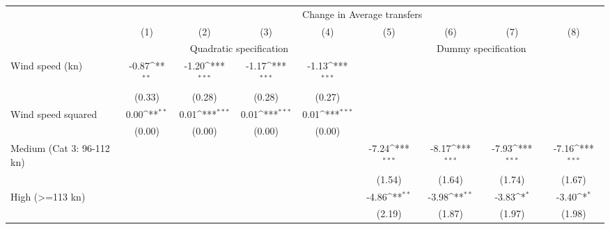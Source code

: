 {
\def\sym#1{\ifmmode^{#1}\else\(^{#1}\)\fi}
\begin{tabular}{l*{8}{c}}
\toprule
                    &\multicolumn{8}{c}{Change in Average transfers}                                                                                                                                \\\cmidrule(lr){2-9}
                    &\multicolumn{1}{c}{(1)}         &\multicolumn{1}{c}{(2)}         &\multicolumn{1}{c}{(3)}         &\multicolumn{1}{c}{(4)}         &\multicolumn{1}{c}{(5)}         &\multicolumn{1}{c}{(6)}         &\multicolumn{1}{c}{(7)}         &\multicolumn{1}{c}{(8)}         \\
& \multicolumn{4}{c}{Quadratic specification} & \multicolumn{4}{c}{Dummy specification} \\
\cmidrule(lr){2-5}\cmidrule(lr){6-9}
\midrule
Wind speed (kn)     &       -0.87\sym{**} &       -1.20\sym{***}&       -1.17\sym{***}&       -1.13\sym{***}&                     &                     &                     &                     \\
                    &      (0.33)         &      (0.28)         &      (0.28)         &      (0.27)         &                     &                     &                     &                     \\
Wind speed squared  &        0.00\sym{**} &        0.01\sym{***}&        0.01\sym{***}&        0.01\sym{***}&                     &                     &                     &                     \\
                    &      (0.00)         &      (0.00)         &      (0.00)         &      (0.00)         &                     &                     &                     &                     \\
Medium (Cat 3: 96-112 kn)&                     &                     &                     &                     &       -7.24\sym{***}&       -8.17\sym{***}&       -7.93\sym{***}&       -7.16\sym{***}\\
                    &                     &                     &                     &                     &      (1.54)         &      (1.64)         &      (1.74)         &      (1.67)         \\
High (>=113 kn)     &                     &                     &                     &                     &       -4.86\sym{**} &       -3.98\sym{**} &       -3.83\sym{*}  &       -3.40\sym{*}  \\
                    &                     &                     &                     &                     &      (2.19)         &      (1.87)         &      (1.97)         &      (1.98)         \\

\end{tabular}}
